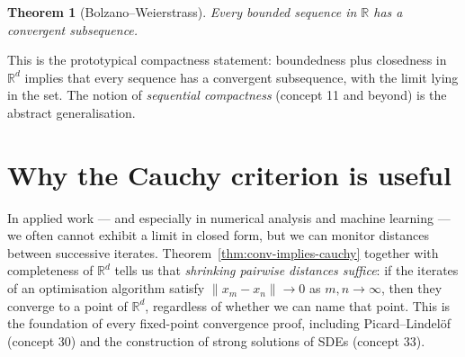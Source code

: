 \documentclass[11pt]{article}
\newtheorem{theorem}{Theorem}
\theoremstyle{definition}
\theoremstyle{remark}
\begin{document}
\begin{theorem}[Bolzano--Weierstrass]
Every bounded sequence in $\mathbb{R}$ has a convergent
subsequence.
\end{theorem}

This is the prototypical compactness statement: boundedness
plus closedness in $\mathbb{R}^d$ implies that every sequence
has a convergent subsequence, with the limit lying in the
set. The notion of \emph{sequential compactness} (concept 11
and beyond) is the abstract generalisation.

\section{Why the Cauchy criterion is useful}

In applied work --- and especially in numerical analysis and
machine learning --- we often cannot exhibit a limit in
closed form, but we can monitor distances between successive
iterates. Theorem~\ref{thm:conv-implies-cauchy} together with
completeness of $\mathbb{R}^d$ tells us that
\emph{shrinking pairwise distances suffice}: if the iterates
of an optimisation algorithm satisfy
$\|x_m - x_n\| \to 0$ as $m, n \to \infty$, then they
converge to a point of $\mathbb{R}^d$, regardless of whether
we can name that point. This is the foundation of every
fixed-point convergence proof, including Picard--Lindel\"of
(concept 30) and the construction of strong solutions of
SDEs (concept 33).
\end{document}
